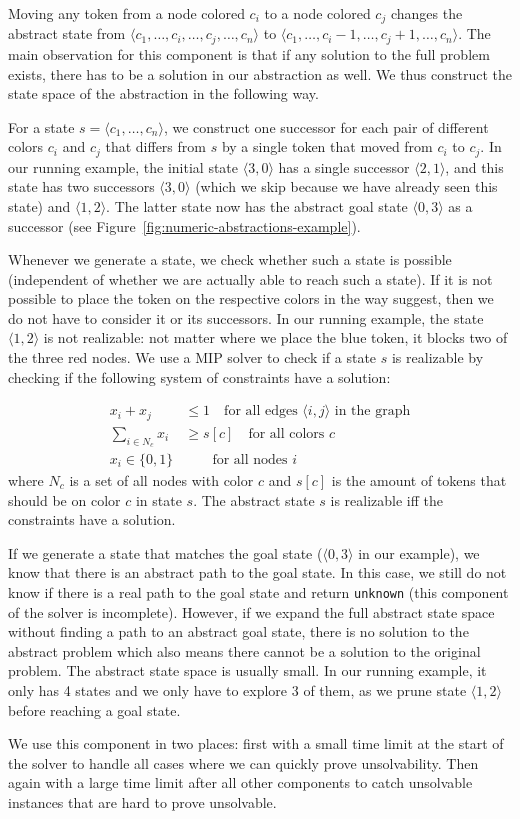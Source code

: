 Moving any token from a node colored $c_i$ to a node colored $c_j$ changes the
abstract state from $\langle c_1, \dots, c_i, \dots, c_j, \dots, c_n \rangle$ to
$\langle c_1, \dots, c_i-1, \dots, c_j+1, \dots, c_n \rangle$. The main
observation for this component is that if any solution to the full problem
exists, there has to be a solution in our abstraction as well. We thus construct
the state space of the abstraction in the following way.

For a state $s = \langle c_1, \dots, c_n \rangle$, we construct one successor
for each pair of different colors $c_i$ and $c_j$ that differs from $s$ by a
single token that moved from $c_i$ to $c_j$. In our running example, the initial
state $\langle 3, 0\rangle$ has a single successor $\langle 2, 1\rangle$, and
this state has two successors $\langle 3, 0\rangle$ (which we skip because we
have already seen this state) and $\langle 1, 2\rangle$. The latter state now
has the abstract goal state $\langle 0, 3\rangle$ as a successor (see
Figure~\ref{fig:numeric-abstractions-example}).

Whenever we generate a state, we check whether such a state is possible
(independent of whether we are actually able to reach such a state). If it is
not possible to place the token on the respective colors in the way suggest,
then we do not have to consider it or its successors. In our running example,
the state $\langle 1, 2 \rangle$ is not realizable: not matter where we place
the blue token, it blocks two of the three red nodes. We use a MIP solver to
check if a state $s$ is realizable by checking if the following system of
constraints have a solution:

\begin{align*}
    x_i + x_j &\le 1 \quad \text{for all edges $\langle i, j \rangle$ in the graph}\\
    \sum_{i \in N_c} x_i &\ge s[c] \quad \text{for all colors $c$} \\
    x_i \in \{0, 1\} & \qquad\text{for all nodes $i$}
\end{align*}
where $N_c$ is a set of all nodes with color $c$ and $s[c]$ is the amount of
tokens that should be on color $c$ in state $s$. The abstract state $s$ is realizable iff the
constraints have a solution.

If we generate a state that matches the goal state ($\langle 0, 3\rangle$ in our
example), we know that there is an abstract path to the goal state. In this case, we
still do not know if there is a real path to the goal state and return
\texttt{unknown} (this component of the solver is incomplete). However, if we
expand the full abstract state space without finding a path to an abstract goal
state, there is no solution to the abstract problem which also means there
cannot be a solution to the original problem. The abstract state space is
usually small. In our running example, it only has 4 states and we only have to
explore 3 of them, as we prune state $\langle 1, 2 \rangle$ before reaching a
goal state.

We use this component in two places: first with a small time limit at the start of
the solver to handle all cases where we can quickly prove unsolvability. Then
again with a large time limit after all other components to catch unsolvable
instances that are hard to prove unsolvable.
